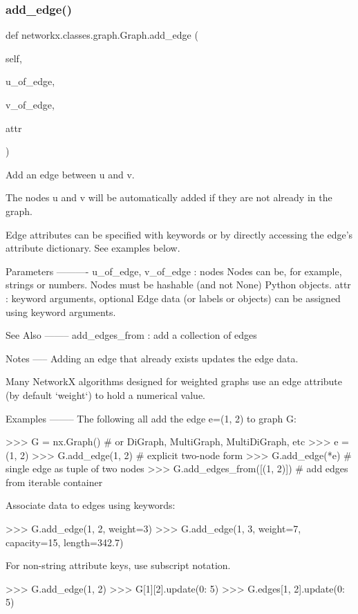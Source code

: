 \subsubsection{\texorpdfstring{add\+\_\+edge()}{add\_edge()}}
{\footnotesize\ttfamily def networkx.\+classes.\+graph.\+Graph.\+add\+\_\+edge (\begin{DoxyParamCaption}\item[{}]{self,  }\item[{}]{u\+\_\+of\+\_\+edge,  }\item[{}]{v\+\_\+of\+\_\+edge,  }\item[{}]{attr }\end{DoxyParamCaption})}

\begin{DoxyVerb}Add an edge between u and v.

The nodes u and v will be automatically added if they are
not already in the graph.

Edge attributes can be specified with keywords or by directly
accessing the edge's attribute dictionary. See examples below.

Parameters
----------
u_of_edge, v_of_edge : nodes
    Nodes can be, for example, strings or numbers.
    Nodes must be hashable (and not None) Python objects.
attr : keyword arguments, optional
    Edge data (or labels or objects) can be assigned using
    keyword arguments.

See Also
--------
add_edges_from : add a collection of edges

Notes
-----
Adding an edge that already exists updates the edge data.

Many NetworkX algorithms designed for weighted graphs use
an edge attribute (by default `weight`) to hold a numerical value.

Examples
--------
The following all add the edge e=(1, 2) to graph G:

>>> G = nx.Graph()  # or DiGraph, MultiGraph, MultiDiGraph, etc
>>> e = (1, 2)
>>> G.add_edge(1, 2)  # explicit two-node form
>>> G.add_edge(*e)  # single edge as tuple of two nodes
>>> G.add_edges_from([(1, 2)])  # add edges from iterable container

Associate data to edges using keywords:

>>> G.add_edge(1, 2, weight=3)
>>> G.add_edge(1, 3, weight=7, capacity=15, length=342.7)

For non-string attribute keys, use subscript notation.

>>> G.add_edge(1, 2)
>>> G[1][2].update({0: 5})
>>> G.edges[1, 2].update({0: 5})
\end{DoxyVerb}
 \mbox{\label{classnetworkx_1_1classes_1_1graph_1_1Graph_a17001a607a31ab1b22a11befb92e0dde}} 

